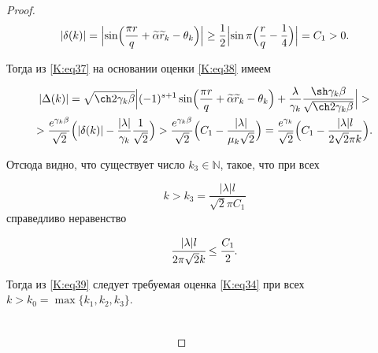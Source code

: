 \begin{proof}
\begin{equation}

\label{K:eq38}

|\delta(k)|=\Bigl|\sin\Bigl(\frac{\pi r}{q}+\widetilde{\alpha}\widetilde{r}_{k}-\theta_k\Bigr)

\Bigr|\geq\frac{1}{2}\Bigl|\sin \pi\Bigl(\frac{r}{q}-\frac{1}{4}\Bigr)\Bigr|=C_{1}>0.

\end{equation}

Тогда из \eqref{K:eq37} на основании оценки \eqref{K:eq38} имеем

\begin{multline}

\label{K:eq39}

|\Delta(k)|=\sqrt{\ch 2\gamma_{k}\beta}\Bigl|(-1)^{s+1}

\sin\Bigl(\frac{\pi r}{q}+\widetilde{\alpha}\widetilde{r}_{k} -\theta_{k}\Bigr)

+\frac{\lambda}{\gamma_{k}}\frac{\sh\gamma_{k}\beta}{\sqrt{\ch 2\gamma_{k}\beta}}\Bigr|>\\

>\frac{e^{\gamma_{k}\beta}}{\sqrt{2}}

\Bigl(|\delta(k)|-

\frac{|\lambda|}{\gamma_{k}}\frac{1}{\sqrt{2}}\Bigr)>

\frac{e^{\gamma_{k}\beta}}{\sqrt{2}}\Bigl(C_{1}-\frac{|\lambda|}{\mu_{k}\sqrt{2}}\Bigr)=

\frac{e^{\gamma_{k}}}{\sqrt{2}}\Bigl(C_{1}-\frac{|\lambda|l}{2\sqrt{2}\pi k}\Bigr).

\end{multline}

Отсюда видно, что существует число $k_3 \in \mathbb{N}$, такое, что при всех 

$$k >k_3=\frac{|\lambda|l}{\sqrt{2}\pi C_{1}}$$ справедливо неравенство

$$

\cfrac{|\lambda|l}{2\pi \sqrt 2 k}\leq \cfrac{C_1}2.

$$

Тогда из \eqref{K:eq39} следует требуемая оценка \eqref{K:eq34}  при всех $k>k_0=\max \{k_1,k_2,k_3\}$.



~~~~~~~~~~~~~~~~~~~~~~~~~~~~~~~~~~~~~~~~~~~~~~~~~~~~~~~~~~~~~~~~~~~~~~~~~~~~~~~~~~~~~~~~~~~~~~~~~~~~~~\end{proof} 



\smallskip



